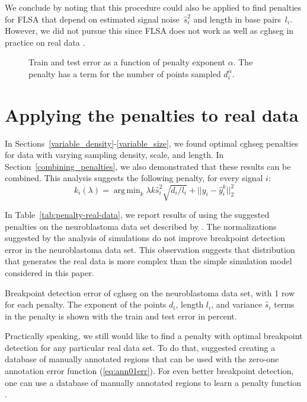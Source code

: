 \documentclass{jsfds} %
\newcommand{\fig}[3][H]{
  \begin{figure}[#1]
    \hskip -1cm
    
    \caption{#3}
    \label{fig:#2}
  \end{figure}
}
\newcommand{\tab}[3][H]{
  \begin{table}[#1]
    \centering
    
    \caption{#3}
    \label{tab:#2}
  \end{table}
}
\DeclareMathOperator*{\argmin}{arg\,min}
\begin{document}
We conclude by noting that this procedure could also be applied to
find penalties for FLSA that depend on estimated signal noise~$\hat
s_i^2$ and length in base pairs~$l_i$. However, we did not pursue this
since FLSA does not work as well as cghseg in practice on real data
\citep{HOCKING-breakpoints}.

\fig{variable-density-error-alpha-flsa}{Train and test error as a
  function of penalty exponent $\alpha$. The penalty has a term for
  the number of points sampled $d_i^\alpha$.}


\newpage

\section{Applying the penalties to real data}

In Sections~\ref{variable_density}-\ref{variable_size}, we found
optimal cghseg penalties for data with varying sampling density,
scale, and length. In Section~\ref{combining_penalties}, we also
demonstrated that these results can be combined. This analysis
suggests the following penalty, for every signal $i$:
\begin{equation}
  \label{eq:composite_penalty}
  k_i(\lambda) = 
  \argmin_k
  \lambda k \hat s_i^2 \sqrt{d_i/l_i}  +
  ||y_i - \hat y_i^k||^2_2
\end{equation}

In Table~\ref{tab:penalty-real-data}, we report results of using the
suggested penalties on the neuroblastoma data set described by
\citet{HOCKING-breakpoints}. The normalizations suggested by the
analysis of simulations do not improve breakpoint detection error in
the neuroblastoma data set. This observation suggests that
distribution that generates the real data is more complex than the
simple simulation model considered in this paper.

\tab{penalty-real-data}{Breakpoint detection error of cghseg on the
  neuroblastoma data set, with 1 row for each penalty. The exponent of
  the points $d_i$, length $l_i$, and variance $\hat s_i$ terms in the
  penalty is shown with the train and test error in percent. }

Practically speaking, we still would like to find a penalty with
optimal breakpoint detection for any particular real data set. To do
that, \citet{HOCKING-breakpoints} suggested creating a database of
manually annotated regions that can be used with the zero-one
annotation error function (\ref{eq:ann01err}). For even better
breakpoint detection, one can use a database of manually annotated
regions to learn a penalty function \citep{HOCKING-penalties}.
\end{document}
